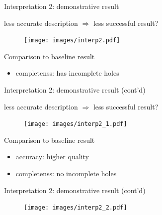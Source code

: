 \documentclass[10pt]{beamer}
\begin{document}
\begin{frame}{Interpretation 2: demonstrative result}

less accurate description $\Rightarrow$ less successful result?

\begin{figure}
\centering
\texttt{[image: images/interp2.pdf]}
\end{figure}

\begin{exampleblock}{Comparison to baseline result}
\begin{itemize}
\item completenss: has incomplete holes
\end{itemize}
\end{exampleblock}

\end{frame}

\begin{frame}{Interpretation 2: demonstrative result (cont'd)}

less accurate description $\Rightarrow$ less successful result?

\begin{figure}
\centering
\texttt{[image: images/interp2\_1.pdf]}
\end{figure}

\begin{exampleblock}{Comparison to baseline result}
\begin{itemize}
\item accuracy: higher quality
\item completenss: no incomplete holes
\end{itemize}
\end{exampleblock}

\end{frame}

\begin{frame}{Interpretation 2: demonstrative result (cont'd)}

\begin{figure}
\centering
\texttt{[image: images/interp2\_2.pdf]}
\end{figure}

\end{frame}
\end{document}

